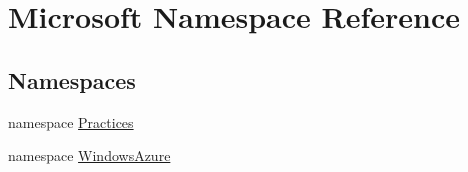 \hypertarget{namespaceMicrosoft}{}\section{Microsoft Namespace Reference}
\label{namespaceMicrosoft}
\subsection*{Namespaces}
\begin{DoxyCompactItemize}
\item 
namespace \hyperlink{namespaceMicrosoft_1_1Practices}{Practices}
\item 
namespace \hyperlink{namespaceMicrosoft_1_1WindowsAzure}{Windows\+Azure}
\end{DoxyCompactItemize}
